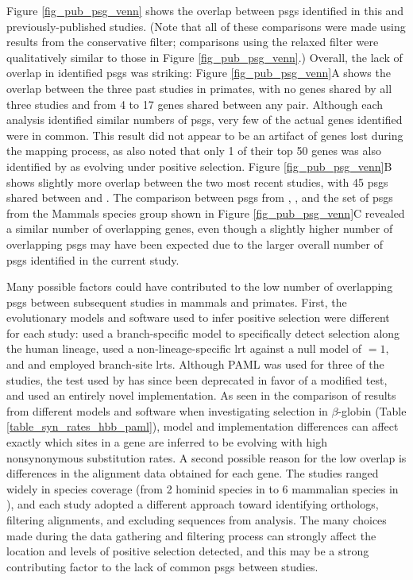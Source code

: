 Figure \ref{fig_pub_psg_venn} shows the overlap between \acp{psg}
identified in this and previously-published studies. (Note that all of
these comparisons were made using results from the conservative
filter; comparisons using the relaxed filter were qualitatively
similar to those in Figure \ref{fig_pub_psg_venn}.) Overall, the lack
of overlap in identified \acp{psg} was striking: Figure
\ref{fig_pub_psg_venn}A shows the overlap between the three past
studies in primates, with no genes shared by all three studies and
from 4 to 17 genes shared between any pair. Although each analysis
identified similar numbers of \acp{psg}, very few of the actual genes
identified were in common. This result did not appear to be an
artifact of genes lost during the mapping process, as
\citet{Nielsen2005} also noted that only 1 of their top 50 genes was
also identified by \citet{Clark2003} as evolving under positive
selection. Figure \ref{fig_pub_psg_venn}B shows slightly more overlap
between the two most recent studies, with 45 \acp{psg} shared between
\citet{Kosiol2008} and \citet{Macaque2007}. The comparison between
\acp{psg} from \citet{Nielsen2005}, \citet{Kosiol2008}, and the set of
\psgeone \acp{psg} from the Mammals species group shown in Figure
\ref{fig_pub_psg_venn}C revealed a similar number of overlapping
genes, even though a slightly higher number of overlapping \acp{psg}
may have been expected due to the larger overall number of \acp{psg}
identified in the current study.


Many possible factors could have contributed to the low number of
overlapping \acp{psg} between subsequent studies in mammals and
primates. First, the evolutionary models and software used to infer
positive selection were different for each study: \citet{Clark2003}
used a branch-specific model to specifically detect selection along
the human lineage, \citet{Nielsen2005} used a non-lineage-specific
\ac{lrt} against a null model of \dnds$=1$, and \citet{Macaque2007}
and \citet{Kosiol2008} employed branch-site \acp{lrt}. Although PAML
was used for three of the studies, the test used by \citet{Clark2003}
has since been deprecated in favor of a modified test, and
\citet{Kosiol2008} used an entirely novel implementation. As seen in
the comparison of results from different models and software when
investigating selection in $\beta$-globin (Table
\ref{table_syn_rates_hbb_paml}), model and implementation differences
can affect exactly which sites in a gene are inferred to be evolving
with high nonsynonymous substitution rates. A second possible reason
for the low overlap is differences in the alignment data obtained for
each gene. The studies ranged widely in species coverage (from 2
hominid species in \citet{Nielsen2005} to 6 mammalian species in
\citet{Kosiol2008}), and each study adopted a different approach
toward identifying orthologs, filtering alignments, and excluding
sequences from analysis. The many choices made during the data
gathering and filtering process can strongly affect the location and
levels of positive selection detected, and this may be a strong
contributing factor to the lack of common \acp{psg} between studies.

